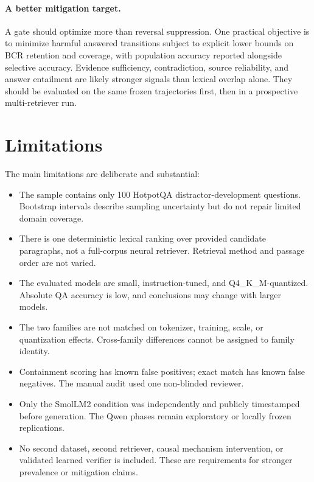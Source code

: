 \documentclass[10pt,twocolumn]{article}
\begin{document}
\paragraph{A better mitigation target.}
A gate should optimize more than reversal suppression. One practical objective is to minimize harmful answered transitions subject to explicit lower bounds on BCR retention and coverage, with population accuracy reported alongside selective accuracy. Evidence sufficiency, contradiction, source reliability, and answer entailment are likely stronger signals than lexical overlap alone. They should be evaluated on the same frozen trajectories first, then in a prospective multi-retriever run.

\section{Limitations}

The main limitations are deliberate and substantial:
\begin{itemize}
  \item The sample contains only 100 HotpotQA distractor-development questions. Bootstrap intervals describe sampling uncertainty but do not repair limited domain coverage.
  \item There is one deterministic lexical ranking over provided candidate paragraphs, not a full-corpus neural retriever. Retrieval method and passage order are not varied.
  \item The evaluated models are small, instruction-tuned, and Q4\_K\_M-quantized. Absolute QA accuracy is low, and conclusions may change with larger models.
  \item The two families are not matched on tokenizer, training, scale, or quantization effects. Cross-family differences cannot be assigned to family identity.
  \item Containment scoring has known false positives; exact match has known false negatives. The manual audit used one non-blinded reviewer.
  \item Only the SmolLM2 condition was independently and publicly timestamped before generation. The Qwen phases remain exploratory or locally frozen replications.
  \item No second dataset, second retriever, causal mechanism intervention, or validated learned verifier is included. These are requirements for stronger prevalence or mitigation claims.
\end{itemize}
\end{document}
